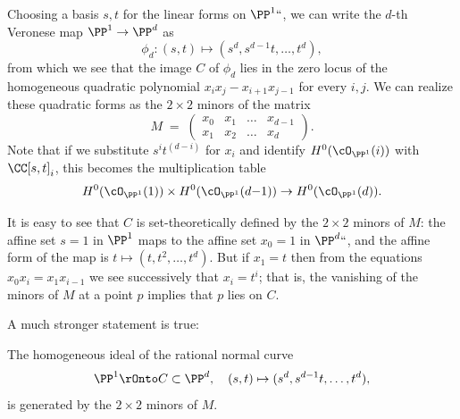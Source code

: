 Choosing a basis $s,t$ for the linear forms on $\PP^1` `$, we can
write the $d$-th
%
Veronese map $\PP^{1}\to \PP^{d}$ as
$$
\phi_d : (s,t) \mapsto (s^d, s^{d-1}t,\dots, t^d)
,
$$
from which we see that the image $C$ of $\phi_d$ lies in the zero locus of the homogeneous quadratic polynomial $x_i x_j - x_{i+1}x_{j-1}$ for every $i,j$. We can realize these quadratic forms as the $2\times 2$ minors of the matrix
$$
M \; = \; \begin{pmatrix}
x_0 & x_1 & \dots & x_{d-1} \\
x_1 & x_2 & \dots & x_d
\end{pmatrix}.
$$
Note that if we substitute $s^it^{(d-i)}$ for $x_i$ and identify $H^0(\cO_{\PP^1}(i))$ with $\CC[s,t]_i$, this becomes the multiplication table
$$
H^0(\cO_{\PP^1}(1)) \times H^0(\cO_{\PP^1}(d{-}1)) \to H^0(\cO_{\PP^1}(d)).
$$


It is easy to see that $C$ is
set-theoretically
%
%
defined by the $2\times 2$ minors of $M$: the affine set $s=1$ in $\PP^1$ maps
to the affine set $x_0 = 1$ in $\PP^d` `$, and the affine form of the map is $t \mapsto (t, t^2, \dots, t^d)$. But if $x_1 = t$ then from
the equations $x_0x_i = x_1x_{i-1}$ we see successively that $x_i = t^i$;
that is, the vanishing of the minors of $M$ at a point $p$
implies that $p$ lies on $C$.

A much stronger statement is true:

\begin{proposition}\label{RNC generators} The homogeneous ideal of the
rational normal curve
%
$$
\PP^1 \rOnto C \subset \PP^d,\quad (s,t) \mapsto (s^d, s^{d-1}t, \dots, t^d),
$$
 is generated by the
 $2\times 2$ minors of $M$.
  \end{proposition}

%

